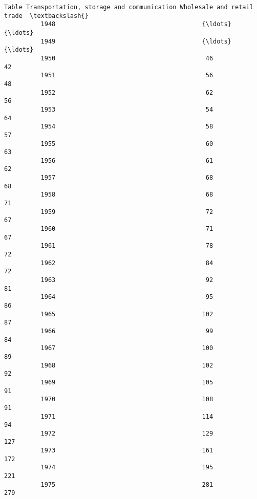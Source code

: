 \documentclass[11pt]{article}
\begin{document}
\begin{Verbatim}[commandchars=\\\{\}]
          Table Transportation, storage and communication Wholesale and retail trade  \textbackslash{}
          1948                                        {\ldots}                        {\ldots}   
          1949                                        {\ldots}                        {\ldots}   
          1950                                         46                         42   
          1951                                         56                         48   
          1952                                         62                         56   
          1953                                         54                         64   
          1954                                         58                         57   
          1955                                         60                         63   
          1956                                         61                         62   
          1957                                         68                         68   
          1958                                         68                         71   
          1959                                         72                         67   
          1960                                         71                         67   
          1961                                         78                         72   
          1962                                         84                         72   
          1963                                         92                         81   
          1964                                         95                         86   
          1965                                        102                         87   
          1966                                         99                         84   
          1967                                        100                         89   
          1968                                        102                         92   
          1969                                        105                         91   
          1970                                        108                         91   
          1971                                        114                         94   
          1972                                        129                        127   
          1973                                        161                        172   
          1974                                        195                        221   
          1975                                        281                        279   
          

\end{Verbatim}
\end{document}

